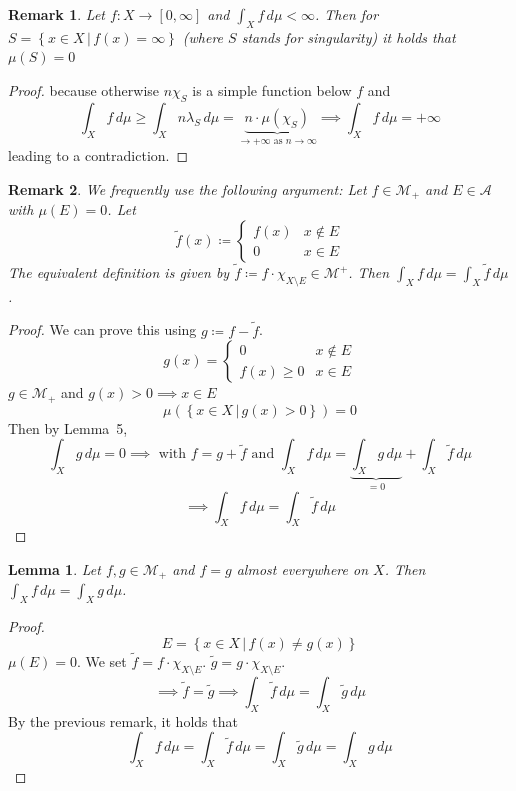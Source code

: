 \documentclass{article}
\newtheorem{lemma}{Lemma}  \numberwithin{lemma}{section}
\newtheorem{remark}{Remark}  \numberwithin{remark}{section}
\newcommand{\setdef}[2]{\left\{\left.#1\,\right|\,#2\right\}}
\begin{document}
\begin{remark}
  Let $f: X \to [0,\infty]$ and $\int_X f \, d\mu < \infty$.
  Then for $S = \setdef{x \in X}{f(x) = \infty}$ (where $S$ stands for \emph{singularity})
  it holds that $\mu(S) = 0$
\end{remark}
\begin{proof}
  because otherwise $n \chi_S$ is a simple function below $f$ and
  \[
  	\int_X f \, d\mu \geq \int_X n \lambda_S \, d\mu = \underbrace{n \cdot \mu(\chi_S)}_{\to +\infty \text{ as } n\to\infty}
    \implies \int_X f \, d\mu = +\infty
  \]
  leading to a contradiction.
\end{proof}
\begin{remark}
  We frequently use the following argument:
  Let $f \in \mathcal M_+$ and $E \in \mathcal A$ with $\mu(E) = 0$.
  Let
  \[
  	\tilde f(x) \coloneqq \begin{cases}
  	  f(x) & x \not\in E \\
  	  0 & x \in E
  	\end{cases}
  \]
  The equivalent definition is given by $\tilde f \coloneqq f \cdot \chi_{X \setminus E} \in \mathcal M^+$.
  Then $\int_X f \, d\mu = \int_X \tilde f \, d\mu$.
\end{remark}
\begin{proof}
  We can prove this using $g \coloneqq f - \tilde f$.
  \[
  	g(x) = \begin{cases}
  	  0   & x \not\in E \\
  	  f(x) \geq 0   & x \in E
  	\end{cases}
  \]
  $g \in \mathcal M_+$ and $g(x) > 0 \implies x \in E$
  \[ \mu(\setdef{x \in X}{g(x) > 0}) = 0 \]
  Then by Lemma~5,
  \[ \int_X g \, d\mu = 0 \implies \text{ with } f = g + \tilde f \text{ and } \int_X f \, d\mu = \underbrace{\int_X g \, d\mu}_{=0} + \int_X \tilde f \, d\mu \]
  \[ \implies \int_X f \, d\mu = \int_X \tilde f \, d\mu \]
\end{proof}
\begin{lemma} %
  Let $f, g \in \mathcal M_+$ and $f = g$ almost everywhere on $X$.
  Then $\int_X f \, d\mu = \int_X g \, d\mu$.
\end{lemma}
\begin{proof}
  \[ E = \setdef{x \in X}{f(x) \neq g(x)} \]
  $\mu(E) = 0$. We set $\tilde f = f \cdot \chi_{X \setminus E}$.
  $\tilde g = g \cdot \chi_{X \setminus E}$.
  \[ \implies \tilde f = \tilde g \implies \int_X \tilde f \, d\mu = \int_X \tilde g \, d\mu \]
  By the previous remark, it holds that
  \[ \int_X f \, d\mu = \int_X \tilde f \, d\mu = \int_X \tilde g \, d\mu = \int_X g \, d\mu \]
\end{proof}
\end{document}
